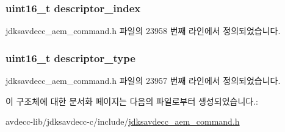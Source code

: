 \subsubsection[{\texorpdfstring{descriptor\+\_\+index}{descriptor_index}}]{\setlength{\rightskip}{0pt plus 5cm}uint16\+\_\+t descriptor\+\_\+index}\hypertarget{structjdksavdecc__aem__command__stop__streaming__response_a042bbc76d835b82d27c1932431ee38d4}{}\label{structjdksavdecc__aem__command__stop__streaming__response_a042bbc76d835b82d27c1932431ee38d4}


jdksavdecc\+\_\+aem\+\_\+command.\+h 파일의 23958 번째 라인에서 정의되었습니다.

\subsubsection[{\texorpdfstring{descriptor\+\_\+type}{descriptor_type}}]{\setlength{\rightskip}{0pt plus 5cm}uint16\+\_\+t descriptor\+\_\+type}\hypertarget{structjdksavdecc__aem__command__stop__streaming__response_ab7c32b6c7131c13d4ea3b7ee2f09b78d}{}\label{structjdksavdecc__aem__command__stop__streaming__response_ab7c32b6c7131c13d4ea3b7ee2f09b78d}


jdksavdecc\+\_\+aem\+\_\+command.\+h 파일의 23957 번째 라인에서 정의되었습니다.



이 구조체에 대한 문서화 페이지는 다음의 파일로부터 생성되었습니다.\+:\begin{DoxyCompactItemize}
\item 
avdecc-\/lib/jdksavdecc-\/c/include/\hyperlink{jdksavdecc__aem__command_8h}{jdksavdecc\+\_\+aem\+\_\+command.\+h}\end{DoxyCompactItemize}
